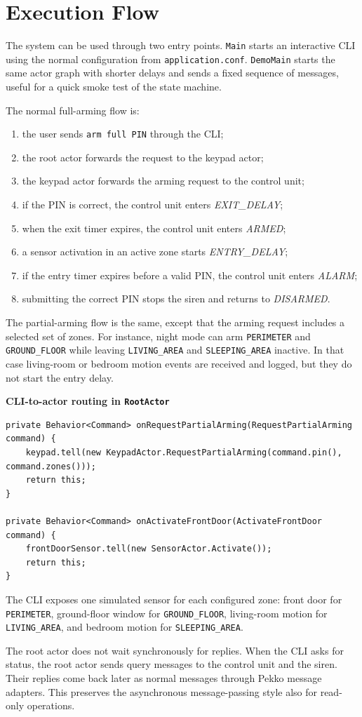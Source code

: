 \section{Execution Flow}

The system can be used through two entry points.
\texttt{Main} starts an interactive CLI using the normal configuration from \texttt{application.conf}.
\texttt{DemoMain} starts the same actor graph with shorter delays and sends a fixed sequence of messages, useful for a
quick smoke test of the state machine.

The normal full-arming flow is:
\begin{enumerate}
    \item the user sends \texttt{arm full PIN} through the CLI;
    \item the root actor forwards the request to the keypad actor;
    \item the keypad actor forwards the arming request to the control unit;
    \item if the PIN is correct, the control unit enters \textit{EXIT\_DELAY};
    \item when the exit timer expires, the control unit enters \textit{ARMED};
    \item a sensor activation in an active zone starts \textit{ENTRY\_DELAY};
    \item if the entry timer expires before a valid PIN, the control unit enters \textit{ALARM};
    \item submitting the correct PIN stops the siren and returns to \textit{DISARMED}.
\end{enumerate}

The partial-arming flow is the same, except that the arming request includes a selected set of zones.
For instance, night mode can arm \texttt{PERIMETER} and \texttt{GROUND\_FLOOR} while leaving
\texttt{LIVING\_AREA} and \texttt{SLEEPING\_AREA} inactive.
In that case living-room or bedroom motion events are received and logged, but they do not start the entry delay.

\medskip

\noindent\textbf{CLI-to-actor routing in \texttt{RootActor}}
\begin{lstlisting}[style=reportcode]
private Behavior<Command> onRequestPartialArming(RequestPartialArming command) {
    keypad.tell(new KeypadActor.RequestPartialArming(command.pin(), command.zones()));
    return this;
}

private Behavior<Command> onActivateFrontDoor(ActivateFrontDoor command) {
    frontDoorSensor.tell(new SensorActor.Activate());
    return this;
}
\end{lstlisting}

The CLI exposes one simulated sensor for each configured zone: front door for \texttt{PERIMETER}, ground-floor window for
\texttt{GROUND\_FLOOR}, living-room motion for \texttt{LIVING\_AREA}, and bedroom motion for
\texttt{SLEEPING\_AREA}.

The root actor does not wait synchronously for replies.
When the CLI asks for status, the root actor sends query messages to the control unit and the siren.
Their replies come back later as normal messages through Pekko message adapters.
This preserves the asynchronous message-passing style also for read-only operations.
